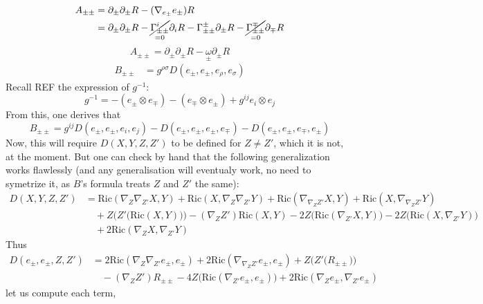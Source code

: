 \documentclass[a4paper,11pt]{article}
\newcommand{\R}{{\mathrm{Ric}}}
\begin{document}
\begin{align*}
    A_{\pm\pm} &= \partial_\pm \partial_\pm R - (\nabla_{e_\pm}e_\pm) R\\
    &= \partial_\pm \partial_\pm R - \underset{=0}{\cancel{\Gamma_{\pm\pm}^i}} \partial_i R - \Gamma_{\pm\pm}^\pm \partial_\pm R - \underset{=0}{\cancel{\Gamma_{\pm\pm}^\mp}} \partial_\mp R
\end{align*}
\begin{equation}
    \boxed{A_{\pm\pm} = \partial_\pm \partial_\pm R - \underset{\pm}{\omega}\partial_\pm R}
\end{equation}
\begin{align*}
    B_{\pm\pm}&= g^{\rho\sigma} D(e_\pm,e_\pm, e_\rho, e_\sigma)
\end{align*}
Recall \color{red} REF \color{black} the expression of $g^{-1}$:
$$g^{-1} = -(e_\pm \otimes e_\mp) - (e_\mp \otimes e_\pm) + g^{ij}e_i\otimes e_j $$
From this, one derives that 
$$B_{\pm\pm}=g^{ij}D(e_\pm,e_\pm, e_i, e_j) - D(e_\pm,e_\pm, e_\pm, e_\mp) - D(e_\pm,e_\pm, e_\mp, e_\pm) $$
Now, this will require $D(X,Y,Z,Z')$ to be defined for $Z\ne Z'$, which it is not, at the moment. But one can check by hand that the following generalization works flawlessly (and any generalisation will eventualy work, no need to symetrize it, as $B$'s formula treats $Z$ and $Z'$ the same):
\begin{align*}
    D(X,Y,Z,Z') 
    &=\R(\nabla_Z\nabla_{Z'} X ,Y )
    + \R( X ,\nabla_Z\nabla_{Z'} Y )
    + \R(\nabla_{\nabla_ZZ'} X , Y )
    + \R( X ,\nabla_{\nabla_ZZ'}Y )\\
    & \quad + Z\big(Z'\big(\R(X ,Y )\big)\big)-(\nabla_Z Z')\R(X ,Y )
    -2 Z\big(\R(\nabla_{Z'} X , Y )\big)
    -2 Z\big(\R(X , \nabla_{Z'} Y )\big) \\
    & \quad + 2 \R(\nabla_Z X , \nabla_{Z'} Y ) 
\end{align*} Thus \begin{align*}
    D(e_\pm,e_\pm,Z,Z') 
    &= 2 \R(\nabla_Z\nabla_{Z'} e_\pm ,e_\pm )
    + 2 \R(\nabla_{\nabla_ZZ'} e_\pm ,e_\pm )
    + Z\big(Z'\big(R_{\pm\pm}\big)\big)\\
    & \quad
    -(\nabla_Z Z') R_{\pm\pm}
    -4 Z\big(\R(\nabla_{Z'} e_\pm , e_\pm )\big)
    + 2 \R(\nabla_Z e_\pm , \nabla_{Z'} e_\pm )
\end{align*}
let us compute each term,
\end{document}

